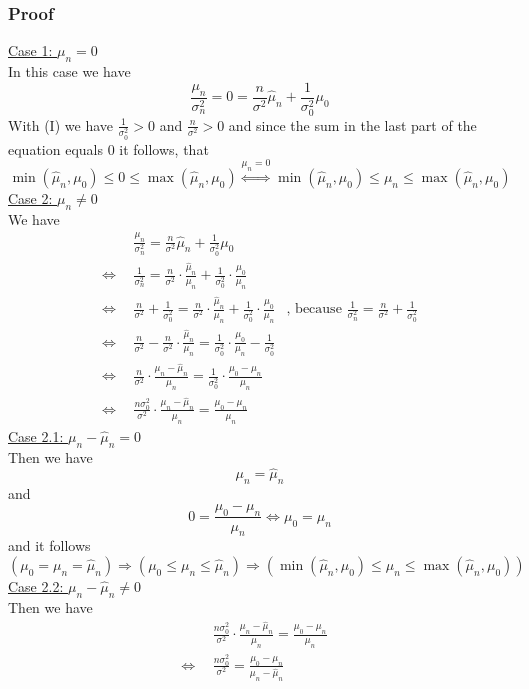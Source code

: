 \documentclass{article}
\begin{document}
\subsubsection*{Proof}
\underline{Case 1: $\mu_n = 0$}\\
In this case we have 
$$ \frac{\mu_n}{\sigma^2_n} = 0 = \frac{n}{\sigma^2}\hat{\mu}_n + \frac{1}{\sigma^2_0}\mu_0 $$
With (I) we have  $\frac{1}{\sigma^2_0} > 0$ and $\frac{n}{\sigma^2} > 0$ and since the sum in the last part of the equation equals $0$ it follows, that 
$$ \min(\hat{\mu}_n,\mu_0) \leq 0  \leq \max(\hat{\mu}_n,\mu_0) \stackrel{\mu_n = 0}{\Leftrightarrow} \min(\hat{\mu}_n,\mu_0) \leq \mu_n \leq  \max(\hat{\mu}_n,\mu_0)$$
\underline{Case 2: $\mu_n \neq 0$}\\
We have
\begin{align*}
	             &\frac{\mu_n}{\sigma^2_n} = \frac{n}{\sigma^2}\hat{\mu}_n + \frac{1}{\sigma^2_0}\mu_0&\\
\Leftrightarrow~~&\frac{1}{\sigma^2_n} = \frac{n}{\sigma^2} \cdot \frac{\hat{\mu}_n}{\mu_n} + \frac{1}{\sigma^2_0} \cdot \frac{\mu_0}{\mu_n}&\\
\Leftrightarrow~~&\frac{n}{\sigma^2} + \frac{1}{\sigma^2_0} = \frac{n}{\sigma^2} \cdot \frac{\hat{\mu}_n}{\mu_n} + \frac{1}{\sigma^2_0} \cdot \frac{\mu_0}{\mu_n}& \text{, because } \frac{1}{\sigma^2_n} = \frac{n}{\sigma^2} + \frac{1}{\sigma^2_0}\\
\Leftrightarrow~~&\frac{n}{\sigma^2} - \frac{n}{\sigma^2} \cdot \frac{\hat{\mu}_n}{\mu_n}  =   \frac{1}{\sigma^2_0} \cdot \frac{\mu_0}{\mu_n} - \frac{1}{\sigma^2_0}& \\
\Leftrightarrow~~&\frac{n}{\sigma^2} \cdot \frac{\mu_n - \hat{\mu}_n}{\mu_n}  =   \frac{1}{\sigma^2_0} \cdot \frac{\mu_0 - \mu_n}{\mu_n}& \\
\Leftrightarrow~~&\frac{n\sigma^2_0}{\sigma^2} \cdot \frac{\mu_n - \hat{\mu}_n}{\mu_n}  =   \frac{\mu_0 - \mu_n}{\mu_n}& 
\end{align*}  
\underline{Case 2.1: $\mu_n - \hat{\mu}_n = 0$}\\
Then we have
$$\mu_n = \hat{\mu}_n$$ 
and 
$$0 = \frac{\mu_0 - \mu_n}{\mu_n} \Leftrightarrow  \mu_0 = \mu_n$$
and it follows
$$(\mu_0 = \mu_n = \hat{\mu}_n) \Rightarrow (\mu_0 \leq \mu_n \leq \hat{\mu}_n) \Rightarrow (\min(\hat{\mu}_n,\mu_0) \leq \mu_n \leq  \max(\hat{\mu}_n,\mu_0))$$ 
\underline{Case 2.2: $\mu_n - \hat{\mu}_n \neq 0$}\\
Then we have
\begin{align*}
&\frac{n\sigma^2_0}{\sigma^2} \cdot \frac{\mu_n - \hat{\mu}_n}{\mu_n}  =   \frac{\mu_0 - \mu_n}{\mu_n}& \\
\Leftrightarrow~~&\frac{n\sigma^2_0}{\sigma^2} =   \frac{\mu_0 - \mu_n}{\mu_n - \hat{\mu}_n}& 
\end{align*}
\end{document}
